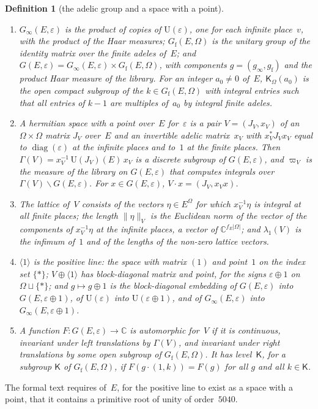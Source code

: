 \documentclass[11pt,a4paper]{article}
\newcommand{\kw}[1]{\emph{#1}}
\newcommand{\m}[1]{\mbox{$#1$}}        %
\theoremstyle{plainx}
\theoremstyle{uprightx}
\newtheorem{definition}[theorem]{Definition}
\newcommand{\CC}{\mathbb{C}}
\newcommand{\abs}[1]{\lvert #1\rvert}
\newcommand{\nrm}[1]{\lVert #1\rVert}
\newcommand{\Us}[1]{\mathrm{U}(#1)}                      %
\newcommand{\dg}[1]{\operatorname{diag}(#1)}             %
\begin{document}
\begin{definition}[the adelic group and a space with a point]\label{d:adelic}
\begin{enumerate}[label=\textup{(\alph*)},leftmargin=2.3em,itemsep=1pt]
\item \m{G_\infty(E,\varepsilon)} is the product of copies of $\Us{\varepsilon}$, one for each infinite place~$v$,
  with the product of the Haar measures; \m{G_{\mathrm f}(E,\Omega)} is the unitary group of the identity matrix
  over the finite adeles of~$E$; and $G(E,\varepsilon)=G_\infty(E,\varepsilon)\times G_{\mathrm f}(E,\Omega)$, with
  components \m{g=(g_\infty,g_{\mathrm f})} and the product Haar measure of the library. For an integer \m{a_0\ne0}
  of~$E$, $\mathsf{K}_\Omega(a_0)$ is the open compact subgroup of the \m{k\in G_{\mathrm f}(E,\Omega)} with integral entries
  such that all entries of \m{k-1} are multiples of~$a_0$ by integral finite adeles.
\item A \kw{hermitian space with a point over~$E$ for~$\varepsilon$} is a pair \m{V=(J_V,x_V)} of an
  \m{\Omega\times\Omega} matrix $J_V$ over~$E$ and an invertible adelic matrix~$x_V$ with
  \m{x_V^{*}J_Vx_V} equal to $\dg{\varepsilon}$ at the infinite places and to~$1$ at the finite places. Then
  $\Gamma(V)=x_V^{-1}\,\mathrm{U}(J_V)(E)\,x_V$ is a discrete subgroup of $G(E,\varepsilon)$, and $\varpi_V$ is the
  measure of the library on $G(E,\varepsilon)$ that computes integrals over $\Gamma(V)\backslash G(E,\varepsilon)$.
  For \m{x\in G(E,\varepsilon)}, \m{V\cdot x=(J_V,x_Vx)}.
\item The \kw{lattice} of~$V$ consists of the vectors \m{\eta\in E^{\Omega}} for which \m{x_V^{-1}\eta} is integral
  at all finite places; the \kw{length} $\nrm{\eta}_V$ is the Euclidean norm of the vector of the components of
  \m{x_V^{-1}\eta} at the infinite places, a vector of $\CC^{f_E\abs{\Omega}}$; and $\lambda_1(V)$ is the infimum
  of~$1$ and of the lengths of the non-zero lattice vectors.
\item \m{\langle1\rangle} is the positive line: the space with matrix $(1)$ and point~$1$ on the index set
  \m{\{*\}}; \m{V\oplus\langle1\rangle} has block-diagonal matrix and point, for the signs \m{\varepsilon\oplus1} on
  \m{\Omega\sqcup\{*\}}; and \m{g\mapsto g\oplus1} is the block-diagonal embedding of $G(E,\varepsilon)$ into
  \m{G(E,\varepsilon\oplus1)}, of $\Us{\varepsilon}$ into \m{\Us{\varepsilon\oplus1}}, and of \m{G_\infty(E,\varepsilon)}
  into \m{G_\infty(E,\varepsilon\oplus1)}.
\item A function \m{F\colon G(E,\varepsilon)\to\CC} is \kw{automorphic for~$V$} if it is continuous, invariant under
  left translations by $\Gamma(V)$, and invariant under right translations by some open subgroup of
  \m{G_{\mathrm f}(E,\Omega)}. It \kw{has level~$\mathsf{K}$}, for a subgroup $\mathsf{K}$ of \m{G_{\mathrm f}(E,\Omega)}, if
  \m{F(g\cdot(1,k))=F(g)} for all \m{g} and all \m{k\in \mathsf{K}}.
\end{enumerate}
\end{definition}
The formal text requires of~$E$, for the positive line to exist as a space with a point, that it contains a
primitive root of unity of order~$5040$.
\end{document}
